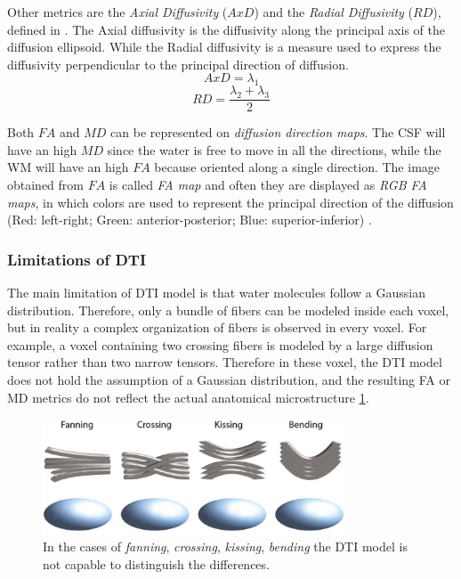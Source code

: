  Other metrics are the \emph{Axial Diffusivity} ($AxD$) and the \emph{Radial Diffusivity} ($RD$), defined in \cite{dtiBook}. The Axial diffusivity is the diffusivity along the principal axis of the diffusion ellipsoid. While the Radial diffusivity is a measure used to express the diffusivity perpendicular to the principal direction of diffusion.
 \begin{equation}
    AxD = \lambda_1
 \end{equation}
 \begin{equation}
    RD = \frac{\lambda_2+\lambda_3}{2}
 \end{equation}

 Both $FA$ and $MD$ can be represented on \emph{diffusion direction maps}. The CSF will have an high $MD$ since the water is free to move in all the directions, while the WM will have an high $FA$ because oriented along a single direction. The image obtained from $FA$ is called \emph{FA map} and often they are displayed as \emph{RGB FA maps}, in which colors are used to represent the principal direction of the diffusion (Red: left-right; Green: anterior-posterior; Blue: superior-inferior) .

  \subsubsection*{Limitations of DTI}\label{section:dti_limitations}
  The main limitation of DTI model is that water molecules follow a Gaussian distribution. Therefore, only a bundle of fibers can be modeled inside each voxel, but in reality a complex organization of fibers is observed in every voxel. For example, a voxel containing two crossing fibers is modeled by a large diffusion tensor rather than two narrow tensors. Therefore in these voxel, the DTI model does not hold the assumption of a Gaussian distribution, and the resulting FA or MD metrics do not reflect the actual anatomical microstructure \ref{fig:fiber_crossing}. \cite{elementiRisonanza}

  \begin{figure}[h]
      \centering
      \includegraphics[width=0.8\textwidth]{images/fiber_orientations.png}
      \caption{In the cases of \emph{fanning}, \emph{crossing}, \emph{kissing}, \emph{bending} the DTI model is not capable to distinguish the differences. \cite{elementiRisonanza}}
      \label{fig:fiber_crossing}
  \end{figure}

